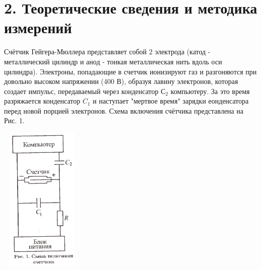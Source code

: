 \section* {2. Теоретические сведения и методика измерений}


Счётчик Гейгера-Мюллера представляет собой 2 электрода (катод - металлический цилиндр и анод - тонкая металлическая нить вдоль оси цилиндра). Электроны, попадающие в счетчик ионизируют газ и разгоняются при довольно высоком напряжении (400 В), образуя лавину электронов, которая создает импульс, передаваемый через конденсатор $С_2$ компьютеру. За это время разряжается конденсатор $C_1$ и наступает "мертвое время" зарядки еонденсатора перед новой порцией электронов. Схема включения счётчика представлена на Рис. 1.


\begin{center}
\includegraphics[width=4cm, height=7cm]{geiger}
\end{center}


